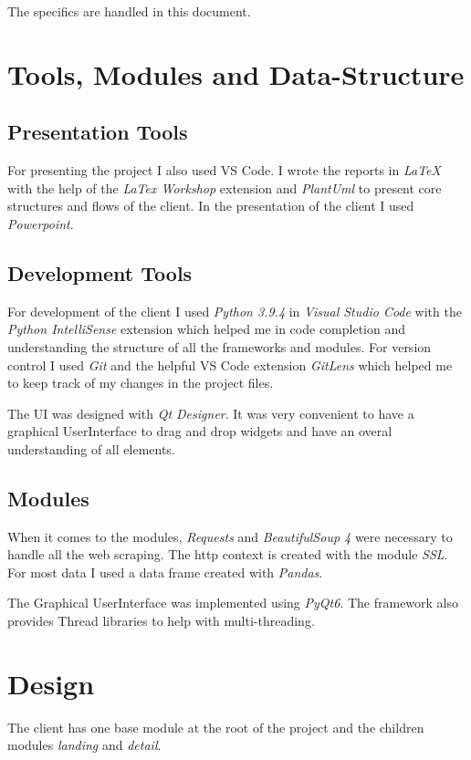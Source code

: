 \documentclass[12pt]{article}
\begin{document}
The specifics are handled in this document.

\section{Tools, Modules and Data-Structure}
\subsection{Presentation Tools}
For presenting the project I also used VS Code. I wrote the reports in \textit{\LaTeX} with the help of the \textit{LaTex Workshop} extension and 
\textit{PlantUml} to present core structures and flows of the client.
In the presentation of the client I used \textit{Powerpoint}. 

\subsection{Development Tools}
For development of the client I used \textit{Python 3.9.4} in \textit{Visual Studio 
Code} with the \textit{Python IntelliSense} extension which helped me in code 
completion and understanding the structure of all the frameworks and modules. For 
version control I used \textit{Git} and the helpful VS Code extension 
\textit{GitLens} which helped me to keep track of my changes in the project files.

The UI was designed with \textit{Qt Designer}. It was very convenient to
have a graphical UserInterface to drag and drop widgets and have an overal 
understanding of all elements.

\subsection{Modules}
When it comes to the modules, \textit{Requests} and \textit{BeautifulSoup 4} were  
necessary to handle all the web scraping. The http context is created with the 
module \textit{SSL}. For most data I used a data frame created with \textit{Pandas}.

The Graphical UserInterface was implemented using \textit{PyQt6}. The framework also
provides Thread libraries to help with multi-threading.

\section{Design}
The client has one base module at the root of the project and the children modules 
\textit{landing} and \textit{detail}.
\end{document}
